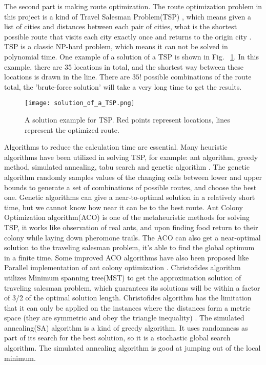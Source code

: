\documentclass[final-report]{report-template}
\begin{document}
The second part is making route optimization. 
The route optimization problem in this project is a kind of Travel Salesman Problem(TSP) \cite{lawler1985travelling}, 
which means given a list of cities and distances between each pair of cities, what is the shortest possible
route that visits each city exactly once and returns to the origin city \cite{TSP_wiki}. 
TSP is a classic NP-hard problem, which means it can not be solved in polynomial time.
One example of a solution of a TSP is shown in Fig.~ \ref{fig:solution_of_TSP}.
In this example, there are 35 locations in total, and the shortest way between these locations is drawn in the line.
There are $35!$ possible combinations of the route total, the 'brute-force solution' will take a very long time to get the results.
\begin{figure}[H]
    \begin{center}
        \texttt{[image: solution\_of\_a\_TSP.png]}
    \end{center}
    \caption{\label{fig:solution_of_TSP} A solution example for TSP. Red points represent locations, lines represent the optimized route.}
\end{figure}

Algorithms to reduce the calculation time are essential. Many heuristic algorithms have been utilized in solving TSP\cite{TSP_review},
for example: ant algorithm, greedy method, simulated annealing, tabu search and genetic algorithm \cite{genetic_on_TSP}. 
The genetic algorithm randomly samples values of the changing cells between lower and upper bounds to generate
a set of combinations of possible routes, and choose the best one.
Genetic algorithms can give a near-to-optimal solution in a relatively short time, but we cannot know how near it can be to the best route.
Ant Colony Optimization algorithm(ACO) is one of the metaheuristic methods for solving TSP, 
it works like observation of real ants, and upon finding food return to their colony while laying down pheromone trails\cite{ACO_on_TSP}. 
The ACO can also get a near-optimal solution to the traveling salesman problem, it's able to find the global optimum in a finite time.
Some improved ACO algorithms have also been proposed like Parallel implementation of ant colony optimization \cite{para_ACO}. 
Christofides algorithm\cite{VANBEVERN2020118} utilizes Minimum spanning tree(MST) to get the approximation solution of traveling salesman problem, 
which guarantees its solutions will be within a factor of 3/2 of the optimal solution length.
Christofides algorithm has the limitation that it can only be applied on the instances where the distances form a metric space (they are symmetric and obey the triangle inequality) \cite{christofides_inbook}.
The simulated annealing(SA) algorithm is a kind of greedy algorithm. It uses randomness as part of its search for the best solution, so it is a stochastic global search algorithm.
The simulated annealing algorithm is good at jumping out of the local minimum\cite{improved_SA}.
\end{document}
